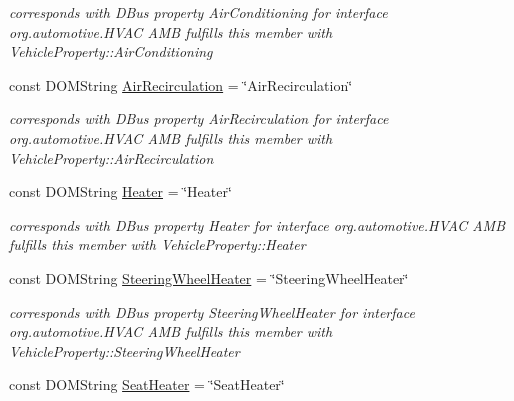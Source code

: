 \begin{DoxyCompactItemize}
\begin{DoxyCompactList}\small\item\em corresponds with D\+Bus property Air\+Conditioning for interface org.\+automotive.\+H\+V\+A\+C A\+M\+B fulfills this member with Vehicle\+Property\+::\+Air\+Conditioning \end{DoxyCompactList}\item 
\hypertarget{interfaceHVAC_a2af8221124a3103ed8e650291201b439}{const D\+O\+M\+String \hyperlink{interfaceHVAC_a2af8221124a3103ed8e650291201b439}{Air\+Recirculation} = \char`\"{}Air\+Recirculation\char`\"{}}\label{interfaceHVAC_a2af8221124a3103ed8e650291201b439}

\begin{DoxyCompactList}\small\item\em corresponds with D\+Bus property Air\+Recirculation for interface org.\+automotive.\+H\+V\+A\+C A\+M\+B fulfills this member with Vehicle\+Property\+::\+Air\+Recirculation \end{DoxyCompactList}\item 
\hypertarget{interfaceHVAC_a1ae099558e45de814f7f98ca40569d20}{const D\+O\+M\+String \hyperlink{interfaceHVAC_a1ae099558e45de814f7f98ca40569d20}{Heater} = \char`\"{}Heater\char`\"{}}\label{interfaceHVAC_a1ae099558e45de814f7f98ca40569d20}

\begin{DoxyCompactList}\small\item\em corresponds with D\+Bus property Heater for interface org.\+automotive.\+H\+V\+A\+C A\+M\+B fulfills this member with Vehicle\+Property\+::\+Heater \end{DoxyCompactList}\item 
\hypertarget{interfaceHVAC_a9ded4ce0a6395a07d6610d578a733f54}{const D\+O\+M\+String \hyperlink{interfaceHVAC_a9ded4ce0a6395a07d6610d578a733f54}{Steering\+Wheel\+Heater} = \char`\"{}Steering\+Wheel\+Heater\char`\"{}}\label{interfaceHVAC_a9ded4ce0a6395a07d6610d578a733f54}

\begin{DoxyCompactList}\small\item\em corresponds with D\+Bus property Steering\+Wheel\+Heater for interface org.\+automotive.\+H\+V\+A\+C A\+M\+B fulfills this member with Vehicle\+Property\+::\+Steering\+Wheel\+Heater \end{DoxyCompactList}\item 
\hypertarget{interfaceHVAC_abcef6ca51ca4070a85169f2ec27482b5}{const D\+O\+M\+String \hyperlink{interfaceHVAC_abcef6ca51ca4070a85169f2ec27482b5}{Seat\+Heater} = \char`\"{}Seat\+Heater\char`\"{}}\label{interfaceHVAC_abcef6ca51ca4070a85169f2ec27482b5}


\end{DoxyCompactItemize}
